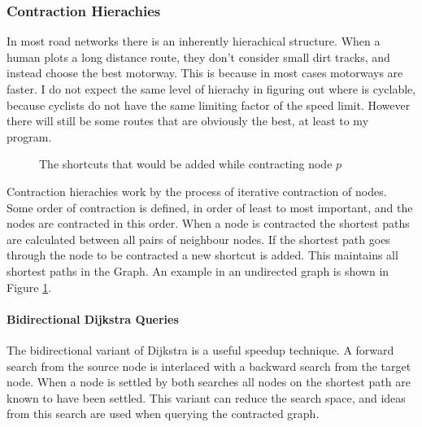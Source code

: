 \documentclass[11pt,twoside,a4paper]{report}
\begin{document}
\subsubsection{Contraction Hierachies}
In most road networks there is an inherently hierachical structure. When a human plots a long distance route, they don't consider small dirt tracks, and instead choose the best motorway. 
This is because in most cases motorways are faster. I do not expect the same level of hierachy in figuring out where is cyclable, because cyclists do not have the same limiting factor of the speed limit. However there will still be 
some routes that are obviously the best, at least to my program.\\
\begin{figure}
    \begin{center}
\end{center}
    \caption{The shortcuts that would be added while contracting node $p$}
    \label{Contraction}
\end{figure}
Contraction hierachies work by the process of iterative contraction of nodes. Some order of contraction is defined, in order of least to most important, and the nodes are contracted in this order.
When a node is contracted the shortest paths are calculated between all pairs of neighbour nodes. If the shortest path goes through the node to be contracted a new shortcut is added. This maintains all shortest paths in the Graph. 
An example in an undirected graph is shown in Figure \ref{Contraction}. 
\paragraph{Bidirectional Dijkstra Queries}
The bidirectional variant of Dijkstra is a useful speedup technique. A forward search from the source node is interlaced with a backward search from the target node. When a node is settled by both searches all nodes on the shortest path are known to have been settled.
This variant can reduce the search space, and ideas from this search are used when querying the contracted graph.
\end{document}
